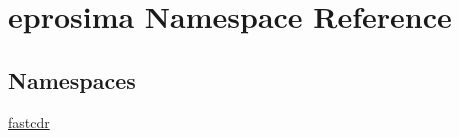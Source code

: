 \hypertarget{namespaceeprosima}{\section{eprosima Namespace Reference}
\label{namespaceeprosima}
}
\subsection*{Namespaces}
\begin{DoxyCompactItemize}
\item 
\hyperlink{namespaceeprosima_1_1fastcdr}{fastcdr}
\end{DoxyCompactItemize}

